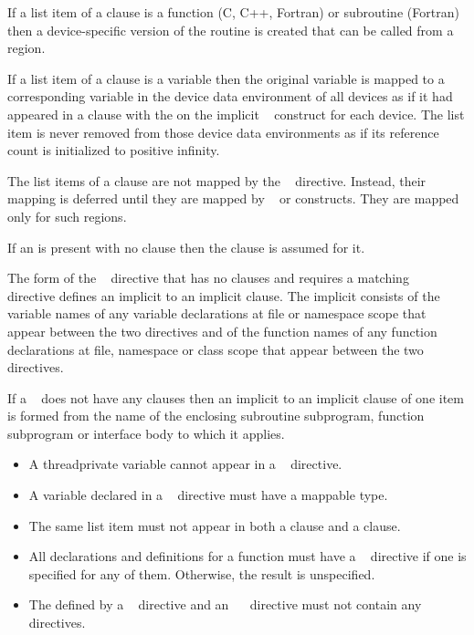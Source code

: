 If a list item of a  clause is a function (C, C++, Fortran) 
or subroutine (Fortran) then a device-specific version of the routine is 
created that can be called from a  region.

If a list item of a  clause is a variable then the original 
variable is mapped to a corresponding variable in the device data environment 
of all devices as if it had appeared in a  clause with the
  on the implicit ~ construct 
for each device. The list item is never removed from those device data 
environments as if its reference count is initialized to positive infinity.

The list items of a  clause are not mapped 
by the ~ directive. Instead, their mapping
is deferred until they are mapped by ~ 
or  constructs. They are mapped only for such regions.

If an  is present with no clause then the 
clause is assumed for it.

\ccppspecificstart
The form of the ~ directive that has no clauses 
and requires a matching ~~ directive
defines an implicit  to an implicit 
clause. The implicit  consists of the variable names 
of any variable declarations at file or namespace scope that appear between 
the two directives and of the function names of any function declarations at 
file, namespace or class scope that appear between the two directives.
\ccppspecificend

\fortranspecificstart
If a ~ does not have any clauses then an implicit 
 to an implicit  clause of one item is formed from
the name of the enclosing subroutine subprogram, function subprogram or 
interface body to which it applies.
\fortranspecificend

\restrictions
\begin{itemize}
\item A threadprivate variable cannot appear in a 
      ~ directive.

\item A variable declared in a ~ directive 
      must have a mappable type.

\item The same list item must not appear in both a  clause and a 
       clause.

\ccppspecificstart
\item All declarations and definitions for a function must have a 
      ~ directive if one is specified for 
      any of them. Otherwise, the result is unspecified.

\item The  defined by a 
      ~ directive and an 
      ~~ directive must not contain
      any ~ directives.
\end{itemize}
\ccppspecificend

